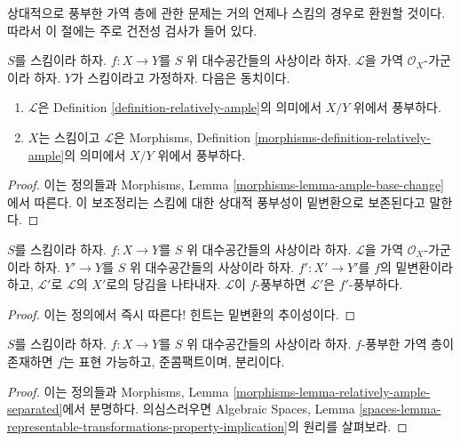 \noindent
상대적으로 풍부한 가역 층에 관한 문제는 거의 언제나 스킴의 경우로
환원할 것이다. 따라서 이 절에는 주로 건전성 검사가 들어 있다.

\begin{lemma}
\label{lemma-relatively-ample-sanity-check}
$S$를 스킴이라 하자. $f : X \to Y$를 $S$ 위 대수공간들의 사상이라
하자. $\mathcal{L}$을 가역 $\mathcal{O}_X$-가군이라 하자.
$Y$가 스킴이라고 가정하자. 다음은 동치이다.
\begin{enumerate}
\item $\mathcal{L}$은 Definition \ref{definition-relatively-ample}의
의미에서 $X/Y$ 위에서 풍부하다.
\item $X$는 스킴이고 $\mathcal{L}$은 Morphisms, Definition
\ref{morphisms-definition-relatively-ample}의 의미에서 $X/Y$ 위에서
풍부하다.
\end{enumerate}
\end{lemma}

\begin{proof}
이는 정의들과 Morphisms, Lemma
\ref{morphisms-lemma-ample-base-change}에서 따른다. 이 보조정리는
스킴에 대한 상대적 풍부성이 밑변환으로 보존된다고 말한다.
\end{proof}

\begin{lemma}
\label{lemma-ample-base-change}
$S$를 스킴이라 하자. $f : X \to Y$를 $S$ 위 대수공간들의 사상이라
하자. $\mathcal{L}$을 가역 $\mathcal{O}_X$-가군이라 하자.
$Y' \to Y$를 $S$ 위 대수공간들의 사상이라 하자.
$f' : X' \to Y'$를 $f$의 밑변환이라 하고, $\mathcal{L}'$로
$\mathcal{L}$의 $X'$로의 당김을 나타내자. $\mathcal{L}$이 $f$-풍부하면
$\mathcal{L}'$은 $f'$-풍부하다.
\end{lemma}

\begin{proof}
이는 정의에서 즉시 따른다! 힌트는 밑변환의 추이성이다.
\end{proof}

\begin{lemma}
\label{lemma-relatively-ample-properties}
$S$를 스킴이라 하자. $f : X \to Y$를 $S$ 위 대수공간들의 사상이라
하자. $f$-풍부한 가역 층이 존재하면 $f$는 표현 가능하고,
준콤팩트이며, 분리이다.
\end{lemma}

\begin{proof}
이는 정의들과 Morphisms, Lemma
\ref{morphisms-lemma-relatively-ample-separated}에서 분명하다.
의심스러우면 Algebraic Spaces, Lemma
\ref{spaces-lemma-representable-transformations-property-implication}의
원리를 살펴보라.
\end{proof}

